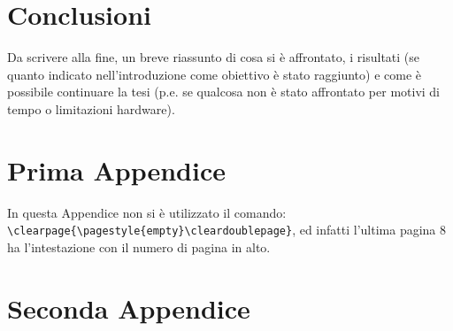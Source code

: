 \documentclass[12pt,a4paper,openright,twoside]{report}
\renewcommand{\chaptermark}[1]{\markboth{\thechapter.\ #1}{}}
\begin{document}
\chapter{Conclusioni}

Da scrivere alla fine, un breve riassunto di cosa si \`e affrontato, i risultati (se quanto indicato nell'introduzione come obiettivo \`e stato raggiunto) e come \`e possibile continuare la tesi (p.e. se qualcosa non \`e stato affrontato per motivi di tempo o limitazioni hardware).



\clearpage{\pagestyle{empty}\cleardoublepage}



\renewcommand{\chaptermark}[1]{\markright{\thechapter \ #1}{}}
\lhead[\fancyplain{}{\bfseries\thepage}]{\fancyplain{}{\bfseries\rightmark}}
\appendix %
\chapter{Prima Appendice} %
In questa Appendice non si \`e utilizzato il comando:\\
\verb"\clearpage{\pagestyle{empty}\cleardoublepage}", ed infatti l'ultima pagina 8 ha l'intestazione con il numero di pagina in alto.



\clearpage{\pagestyle{empty}\cleardoublepage}



\chapter{Seconda Appendice}


\clearpage{\pagestyle{empty}\cleardoublepage}
\label{Bibliography}


\end{document}
